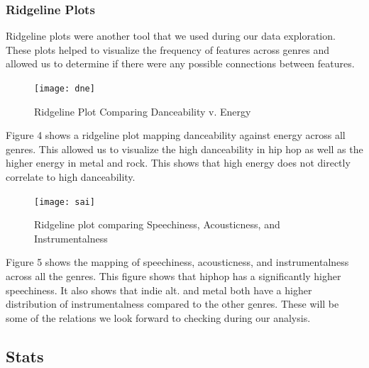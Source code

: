 \documentclass[11pt, a4paper, twocolumn]{article}
\begin{document}
\subsubsection{Ridgeline Plots}
Ridgeline plots were another tool that we used during our data exploration. These plots helped to visualize the frequency of features across genres and allowed us to determine if there were any possible connections between features. 
\begin{figure}[htb!]
\texttt{[image: dne]}
\caption {Ridgeline Plot Comparing Danceability v. Energy}
\end{figure}
Figure 4 shows a ridgeline plot mapping danceability against energy across all genres. This allowed us to visualize the high danceability in hip hop as well as the higher energy in metal and rock. This shows that high energy does not directly correlate to high danceability. 
\begin{figure}[htb!]
\texttt{[image: sai]}
\caption{Ridgeline plot comparing Speechiness, Acousticness, and Instrumentalness}
\end{figure}
Figure 5 shows the mapping of speechiness, acousticness, and instrumentalness across all the genres. This figure shows that hiphop has a significantly higher speechiness. It also shows that indie alt. and metal both have a higher distribution of instrumentalness compared to the other genres. These will be some of the relations we look forward to checking during our analysis. 
\subsection{Stats}
\end{document}
